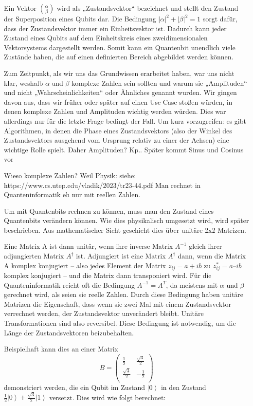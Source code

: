 Ein Vektor $\binom{\alpha}{\beta}$ wird als „Zustandsvektor“ bezeichnet und stellt den Zustand der Superposition eines Qubits dar. Die Bedingung $\left|\alpha\right|^2+\left|\beta\right|^2=1$ sorgt dafür, dass der Zustandsvektor immer ein Einheitsvektor ist. Dadurch kann jeder Zustand eines Qubits auf dem Einheitskreis eines zweidimensionalen Vektorsystems dargestellt werden. Somit kann ein Quantenbit unendlich viele Zustände haben, die auf einen definierten Bereich abgebildet werden können. 

Zum Zeitpunkt, als wir uns das Grundwissen erarbeitet haben, war uns nicht klar, weshalb $\alpha$ und $\beta$ komplexe Zahlen sein sollten und warum sie „Amplituden“ und nicht „Wahrscheinlichkeiten“ oder Ähnliches genannt wurden. Wir gingen davon aus, dass wir früher oder später auf einen Use Case stoßen würden, in denen komplexe Zahlen und Amplituden wichtig werden würden. Dies war allerdings nur für die letzte Frage bedingt der Fall. Um kurz vorzugreifen: es gibt Algorithmen, in denen die Phase eines Zustandsvektors (also der Winkel des Zustandsvektors ausgehend vom Ursprung relativ zu einer der Achsen) eine wichtige Rolle spielt. Daher Amplituden? Kp.. Später kommt Sinus und Cosinus vor   


Wieso komplexe Zahlen? Weil Physik: siehe: https://www.cs.utep.edu/vladik/2023/tr23-44.pdf Man rechnet in Quanteninformatik eh nur mit reellen Zahlen.


Um mit Quantenbits rechnen zu können, muss man den Zustand eines Quantenbits verändern können. Wie dies physikalisch umgesetzt wird, wird später beschrieben. Aus mathematischer Sicht geschieht dies über unitäre 2x2 Matrizen. 

Eine Matrix A ist dann unitär, wenn ihre inverse Matrix $A^{-1}$ gleich ihrer adjungierten Matrix $A^\dag$ ist. Adjungiert ist eine Matrix $A^\dag$ dann, wenn die Matrix A komplex konjugiert – also jedes Element der Matrix $z_{ij}=a+ib$ zu $z_{ij}^\ast=a–ib$ komplex konjugiert – und die Matrix dann transponiert wird. Für die Quanteninformatik reicht oft die Bedingung $A^{-1}=A^T$, da meistens mit $\alpha$ und $\beta$ gerechnet wird, als seien sie reelle Zahlen. Durch diese Bedingung haben unitäre Matrizen die Eigenschaft, dass wenn sie zwei Mal mit einem Zustandsvektor verrechnet werden, der Zustandsvektor unverändert bleibt. Unitäre Transformationen sind also reversibel. Diese Bedingung ist notwendig, um die Länge der Zustandsvektoren beizubehalten.

Beispielhaft kann dies an einer Matrix $$B=\left(\begin{matrix}\frac{1}{2}&\frac{\sqrt3}{2}\\\frac{\sqrt3}{2}&-\frac{1}{2}\\\end{matrix}\right)$$ demonstriert werden, die ein Qubit im Zustand $\left|0\right\rangle$ in den Zustand $\frac{1}{2}\left|0\right\rangle+\frac{\sqrt3}{2}\left|1\right\rangle$ versetzt. Dies wird wie folgt berechnet:

